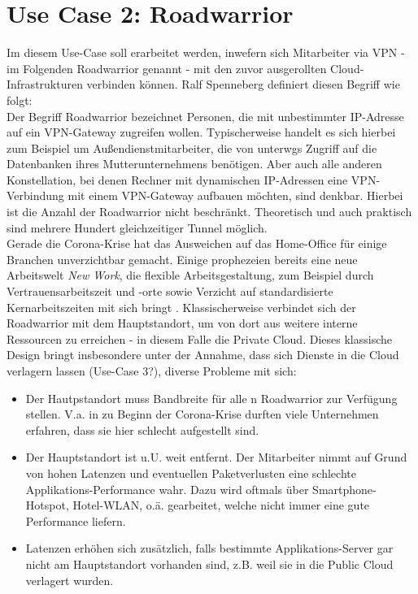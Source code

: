 \section{Use Case 2: Roadwarrior}
Im diesem Use-Case soll erarbeitet werden, inwefern sich Mitarbeiter via VPN - im Folgenden Roadwarrior genannt - mit den zuvor ausgerollten Cloud-Infrastrukturen verbinden können. Ralf Spenneberg definiert diesen Begriff wie folgt:\\
\glqq Der Begriff Roadwarrior bezeichnet Personen, die mit unbestimmter IP-Adresse auf ein VPN-Gateway zugreifen wollen. Typischerweise handelt es sich hierbei zum Beispiel um Außendienstmitarbeiter, die von unterwgs Zugriff auf die Datenbanken ihres Mutterunternehmens benötigen. Aber auch alle anderen Konstellation, bei denen Rechner mit dynamischen IP-Adressen eine VPN-Verbindung mit einem VPN-Gateway aufbauen möchten, sind denkbar. Hierbei ist die Anzahl der Roadwarrior nicht beschränkt. Theoretisch und auch praktisch sind mehrere Hundert gleichzeitiger Tunnel möglich.\grqq{} \cite[S. 199]{Spenneberg2010}\\
Gerade die Corona-Krise hat das Ausweichen auf das Home-Office für einige Branchen unverzichtbar gemacht. Einige prophezeien bereits eine neue Arbeitswelt \textit{New Work}, die \glqq flexible Arbeitsgestaltung, zum Beispiel durch Vertrauensarbeitszeit und -orte sowie Verzicht auf standardisierte Kernarbeitszeiten\grqq{} mit sich bringt \cite{Umbs2020}.
Klassischerweise verbindet sich der Roadwarrior mit dem Hauptstandort, um von dort aus weitere interne Ressourcen zu erreichen - in diesem Falle die Private Cloud. Dieses klassische Design bringt insbesondere unter der Annahme, dass sich Dienste in die Cloud verlagern lassen (Use-Case 3?), diverse Probleme mit sich:

\begin{itemize}
\item Der Hautpstandort muss Bandbreite für alle n Roadwarrior zur Verfügung stellen. V.a. in zu Beginn der Corona-Krise durften viele Unternehmen erfahren, dass sie hier schlecht aufgestellt sind.
\item Der Hauptstandort ist u.U. weit entfernt. Der Mitarbeiter nimmt auf Grund von hohen Latenzen und eventuellen Paketverlusten eine schlechte Applikations-Performance wahr. Dazu wird oftmals über Smartphone-Hotspot, Hotel-WLAN, o.ä. gearbeitet, welche nicht immer eine gute Performance liefern.
\item Latenzen erhöhen sich zusätzlich, falls bestimmte Applikations-Server gar nicht am Hauptstandort vorhanden sind, z.B. weil sie in die Public Cloud verlagert wurden.
\end{itemize}


